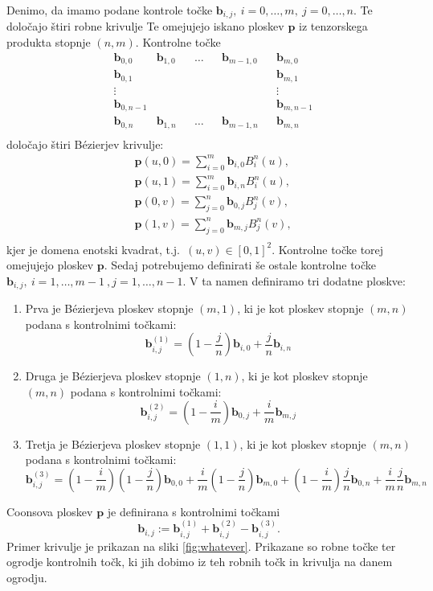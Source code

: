 \documentclass[a4paper,12pt]{article}
\begin{document}
Denimo, da imamo podane kontrole točke $\mathbf{b}_{i,j},~ i=0,\ldots,m,~ j=0,\ldots,n$.
Te določajo štiri robne krivulje 
Te omejujejo iskano ploskev $\mathbf{p}$ iz tenzorskega produkta stopnje $(n,m)$.
Kontrolne točke
\begin{align*}
      &\mathbf{b}_{0,0} &\mathbf{b}_{1,0} & &\ldots & &\mathbf{b}_{m-1,0} & &\mathbf{b}_{m,0} \\
      &\mathbf{b}_{0,1}  &  & &  & &  & &\mathbf{b}_{m,1} \\
      &\vdots  &  &  & &  & & &\vdots\\
      &\mathbf{b}_{0,n-1}  &  &  & &  & &  &\mathbf{b}_{m,n-1} \\ 
      &\mathbf{b}_{0,n} &\mathbf{b}_{1,n} & &\ldots & &\mathbf{b}_{m-1,n} & &\mathbf{b}_{m,n} \\
\end{align*}
določajo štiri Bézierjev krivulje: 
\begin{align*}
   &\mathbf{p}(u,0) =\sum_{i=0}^m \mathbf{b}_{i,0} B_i^n(u),  \\
   &\mathbf{p}(u,1) =\sum_{i=0}^m \mathbf{b}_{i,n} B_i^n(u),  \\
   &\mathbf{p}(0,v) =\sum_{j=0}^n \mathbf{b}_{0,j} B_j^n(v),  \\
   &\mathbf{p}(1,v) =\sum_{j=0}^n \mathbf{b}_{m,j} B_j^n(v),  \\
\end{align*}
kjer je domena enotski kvadrat, t.j.~$(u,v) \in [0,1]^2$.
Kontrolne točke torej omejujejo ploskev $\mathbf{p}$. 
Sedaj potrebujemo definirati še ostale kontrolne točke 
$\mathbf{b}_{i,j},~ i=1,\ldots, m-1~, j=1,\ldots,n-1$. 
V ta namen definiramo tri dodatne ploskve:
\begin{enumerate}
   \item Prva je Bézierjeva ploskev stopnje $(m, 1)$, ki je kot ploskev stopnje $(m,n)$ podana s kontrolnimi točkami:
   $$\mathbf{b}_{i,j}^{(1)} = \left(1-\frac{j}{n}  \right) \mathbf{b}_{i,0} + \frac{j}{n} \mathbf{b}_{i,n} $$
   \item Druga je Bézierjeva ploskev stopnje $(1, n)$, ki je kot ploskev stopnje $(m,n)$ podana s kontrolnimi točkami:
   $$\mathbf{b}_{i,j}^{(2)} = \left(1-\frac{i}{m}  \right) \mathbf{b}_{0,j} + \frac{i}{m} \mathbf{b}_{m,j} $$
   \item Tretja je Bézierjeva ploskev stopnje $(1, 1)$, ki je kot ploskev stopnje $(m,n)$ podana s kontrolnimi točkami:
   $$
   \mathbf{b}_{i,j}^{(3)} = \left(1-\frac{i}{m}  \right) \left(1-\frac{j}{n}  \right) \mathbf{b}_{0,0} 
         + \frac{i}{m} \left(1-\frac{j}{n}  \right) \mathbf{b}_{m,0}
         + \left(1-\frac{i}{m}  \right) \frac{j}{n}  \mathbf{b}_{0,n} 
         + \frac{i}{m} \frac{j}{n} \mathbf{b}_{m,n} 
   $$
\end{enumerate}
Coonsova ploskev $\mathbf{p}$ je definirana s kontrolnimi točkami 
$$\mathbf{b}_{i,j} := \mathbf{b}_{i,j}^{(1)} + \mathbf{b}_{i,j}^{(2)} - \mathbf{b}_{i,j}^{(3)}.$$
Primer krivulje je prikazan na sliki \ref{fig:whatever}. 
Prikazane so robne točke ter ogrodje kontrolnih točk, ki jih dobimo iz teh 
robnih točk in krivulja na danem ogrodju.
\end{document}
